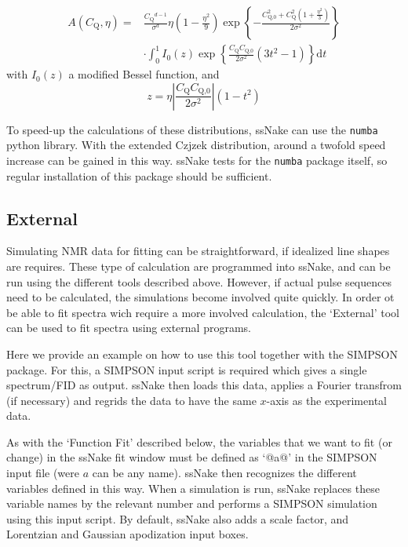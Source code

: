 \documentclass[11pt,a4paper]{article}
\begin{document}
\begin{align}
  A(C_\text{Q},\eta) = & \frac{C_\text{Q}{}^{d-1}}{\sigma^d} \eta \left(1 - \frac{\eta^2}{9} \right)
  \exp \left\{ - \frac{C_\text{Q,0}^2 + C_\text{Q}^2 (1 + \frac{\eta^2}{3})}{2\sigma^2} \right\}\\
  & \cdot \int_0^1 I_0(z) \exp \left\{ \frac{C_\text{Q}C_\text{Q,0}}{2\sigma^2} (3t^2 - 1)   \right\} \text{d}t
\end{align}
with $I_0(z)$ a modified Bessel function, and
\begin{equation}
  z = \eta \left| \frac{C_\text{Q}C_\text{Q,0}}{2\sigma^2}\right| (1 - t^2)
\end{equation}

To speed-up the calculations of these distributions, ssNake can use the \texttt{numba} python library. With
the extended Czjzek distribution, around a twofold speed increase can be gained in this way. ssNake
tests for the \texttt{numba} package itself, so regular installation of this package should be sufficient.


\subsection{External}
Simulating NMR data for fitting can be straightforward, if idealized line shapes are requires. These
type of calculation are programmed into ssNake, and can be run using the different tools described
above. However, if actual pulse sequences need to be calculated, the simulations become involved
quite quickly. In order ot be able to fit spectra wich require a more involved calculation, the
`External' tool can be used to fit spectra using external programs.


Here we provide an example on how to use this tool together with the SIMPSON package\cite{Bak2000SIMPSON,Tosner2014Computer,Tosner2009Optimal}.
For this, a SIMPSON input script is
required which gives a single spectrum/FID as output. ssNake then loads this data, applies a Fourier
transfrom (if necessary) and regrids the data to have the same $x$-axis as the experimental data.

As with the `Function Fit' described below, the variables that we want to fit (or change) in the
ssNake fit window must be defined as `@a@' in the SIMPSON input file (were $a$ can be any name). ssNake
then recognizes the different variables defined in this way. When a simulation is run, ssNake
replaces these variable names by the relevant number and performs a SIMPSON simulation using this
input script. By default, ssNake also adds a scale factor, and Lorentzian and Gaussian apodization
input boxes.
\end{document}
